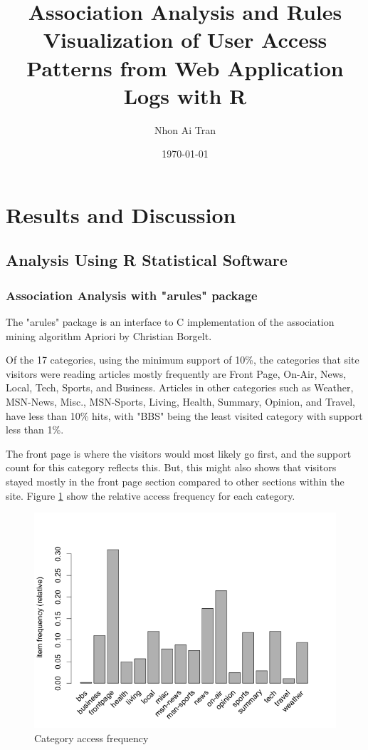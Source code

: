 \documentclass{article}
\title{Association Analysis and Rules Visualization of User Access Patterns from Web Application Logs with R}
\author{Nhon Ai Tran}
\date{\today}
\begin{document}
\maketitle

\section{Results and Discussion}
\subsection{Analysis Using R Statistical Software}
\subsubsection{Association Analysis with "arules" package}
The "arules" package is an interface to C implementation of the association mining algorithm Apriori by Christian Borgelt.  

Of the 17 categories, using the minimum support of 10\%, the categories that site visitors were reading articles mostly frequently are Front Page, On-Air, News, Local, Tech, Sports, and Business.  Articles in other categories such as Weather, MSN-News, Misc., MSN-Sports, Living, Health, Summary, Opinion, and Travel, have less than 10\% hits, with "BBS" being the least visited category with support less than 1\%.

The front page is where the visitors would most likely go first, and the support count for this category reflects this.  But, this might also shows that visitors stayed mostly in the front page section compared to other sections within the site.  Figure \ref{fig:item_frequency} show the relative access frequency for each category. 

\begin{figure}[h!]
  \centering
    \includegraphics[width=1.0\textwidth]{images/item_frequency_plot}
    \caption{Category access frequency}
    \label{fig:item_frequency}
\end{figure}
\end{document}
